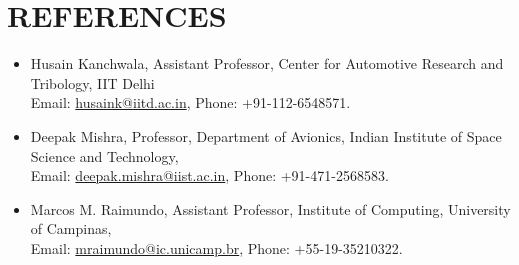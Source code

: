 \documentclass[11pt]{article}
\begin{document}
	\section*{\bf REFERENCES}
\begin{itemize}
	\item Husain Kanchwala, Assistant Professor, Center for Automotive Research and Tribology, IIT Delhi \\
	Email: \href{mailto:husaink@iitd.ac.in}{husaink@iitd.ac.in}, Phone: +91-112-6548571.
	\item Deepak Mishra, Professor, Department of Avionics, Indian Institute of Space Science and Technology, \\
	Email: \href{mailto:deepak.mishra@iist.ac.in}{deepak.mishra@iist.ac.in}, Phone: +91-471-2568583.
	\item Marcos M. Raimundo, Assistant Professor, Institute of Computing, University of Campinas, \\
	Email: \href{mailto:mraimundo@ic.unicamp.br}{mraimundo@ic.unicamp.br}, Phone: +55-19-35210322.
\end{itemize}
	
\end{document}
